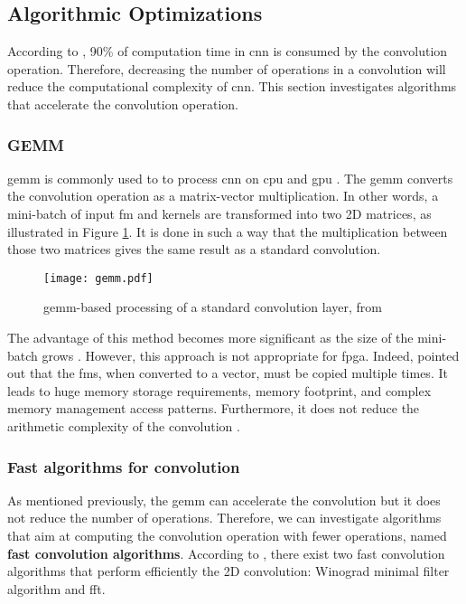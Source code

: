 \subsection{Algorithmic Optimizations} \label{subsec:algopti}
According to \textcite{shawahna_fpga-based_2019}, 90\% of computation time in \acrshort{cnn} is consumed by the convolution operation. Therefore, decreasing the number of operations in a convolution will reduce the computational complexity of \acrshort{cnn}. This section investigates algorithms that accelerate the convolution operation.
%
%
\subsubsection{GEMM}
%
\acrfull{gemm} is commonly used to to process \acrshort{cnn} on \acrshort{cpu} and \acrshort{gpu} \cite{abdelouahab_accelerating_2018}. The \acrshort{gemm} converts the convolution operation as a matrix-vector multiplication. In other words, a mini-batch of input \acrshort{fm} and kernels are transformed into two 2D matrices, as illustrated in Figure \ref{fig:gemm}. It is done in such a way that the multiplication between those two matrices gives the same result as a standard convolution. 
%
\begin{figure}[H]
    \centering
    \texttt{[image: gemm.pdf]}
    \caption{\acrshort{gemm}-based processing of a standard convolution layer, from \cite{abdelouahab_accelerating_2018}}
    \label{fig:gemm}
\end{figure}
%
The advantage of this method becomes more significant as the size of the mini-batch grows \cite{abdelouahab_accelerating_2018}. However, this approach is not appropriate for \acrshort{fpga}. Indeed, \textcite{zhu_efficient_2020, sze_efficient_2017} pointed out that the \acrshort{fm}s, when converted to a vector, must be copied multiple times. It leads to huge memory storage requirements, memory footprint, and complex memory management access patterns. Furthermore, it does not reduce the arithmetic complexity of the convolution \cite{liang_evaluating_2020}.
%
\subsubsection{Fast algorithms for convolution}
%
%
As mentioned previously, the \acrshort{gemm} can accelerate the convolution but it does not reduce the number of operations. Therefore, we can investigate algorithms that aim at computing the convolution operation with fewer operations, named \textbf{fast convolution algorithms}. According to \textcite{liang_evaluating_2020}, there exist two fast convolution algorithms that perform efficiently the 2D convolution: Winograd minimal filter algorithm and \acrfull{fft}. 

